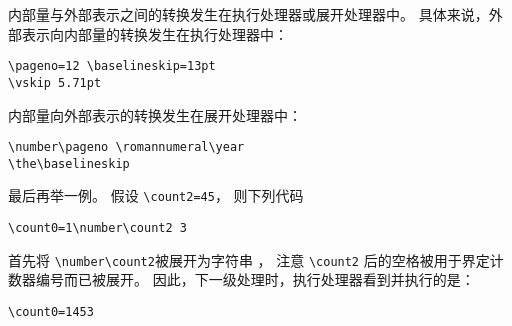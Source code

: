 \documentclass{book}
\begin{document}
内部量与外部表示之间的转换发生在执行处理器或展开处理器中。
具体来说，外部表示向内部量的转换发生在执行处理器中：
\begin{verbatim}
\pageno=12 \baselineskip=13pt
\vskip 5.71pt
\end{verbatim}

内部量向外部表示的转换发生在展开处理器中：
\begin{verbatim}
\number\pageno \romannumeral\year
\the\baselineskip
\end{verbatim}

最后再举一例。
假设 \verb|\count2=45|，
则下列代码
\begin{verbatim}
\count0=1\number\count2 3
\end{verbatim}
首先将 \verb>\number\count2>\textvisiblespace 被展开为字符串 ，
注意 \verb|\count2| 后的空格被用于界定计数器编号而已被展开。
因此，下一级处理时，执行处理器看到并执行的是：
\begin{verbatim}
\count0=1453
\end{verbatim}


\endofchapter
\end{document}
